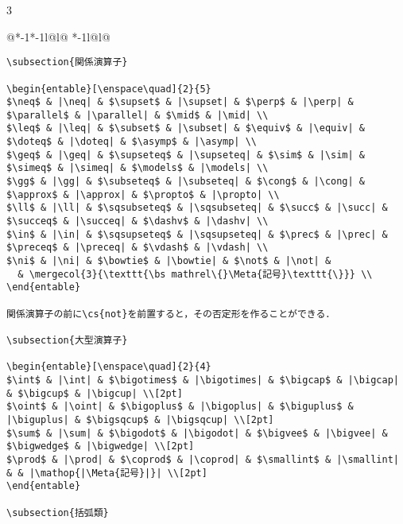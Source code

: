 \documentclass[10pt,a4paper,landscape,dvipdfmx,nomag]{jsarticle}
\makeatletter
\def\set@etsep#1#2{\def\etcolsep{#1}\def\etitemsep{#2}}
\newenvironment{entable}[3][\quad\qquad]{%
  \set@etsep#1\relax\relax
  \begin{tabular}{%
    @{}*{\the\numexpr#3-1}{*{\the\numexpr#2-1}{l@{\etcolsep}}l@{\etitemsep}}%
    *{\the\numexpr#2-1}{l@{\etcolsep}}l@{}}}{%
  \end{tabular}}
\newcommand{\mergecol}[2]{\multicolumn{#1}{@{}l@{}}{#2}}
\newcommand*\eghostguarded{%
  \ifmmode \expandafter\@firstofone
  \else \expandafter\pxqgg@eghostguarded@a
  \fi}
\def\pxqgg@eghostguarded@a#1{%
  {\pxqgg@TI\pxqgg@cwm}%
  #1%
  {\pxqgg@TI\pxqgg@cwm}}
\newcommand{\codefont}{\ttfamily\gtfamily}
\newcommand{\cs}[1]{\eghostguarded{{\codefont \bs #1}}}
\newcommand{\Meta}[1]{$\langle$\mbox{}\emph{#1}\mbox{}$\rangle$}
\makeatother
\begin{document}
\begin{multicols}{3}
\begin{entable}[\enspace]{2}{1}
\begin{verbatim}
\subsection{関係演算子}

\begin{entable}[\enspace\quad]{2}{5}
$\neq$ & |\neq| & $\supset$ & |\supset| & $\perp$ & |\perp| & $\parallel$ & |\parallel| & $\mid$ & |\mid| \\
$\leq$ & |\leq| & $\subset$ & |\subset| & $\equiv$ & |\equiv| & $\doteq$ & |\doteq| & $\asymp$ & |\asymp| \\
$\geq$ & |\geq| & $\supseteq$ & |\supseteq| & $\sim$ & |\sim| & $\simeq$ & |\simeq| & $\models$ & |\models| \\
$\gg$ & |\gg| & $\subseteq$ & |\subseteq| & $\cong$ & |\cong| & $\approx$ & |\approx| & $\propto$ & |\propto| \\
$\ll$ & |\ll| & $\sqsubseteq$ & |\sqsubseteq| & $\succ$ & |\succ| & $\succeq$ & |\succeq| & $\dashv$ & |\dashv| \\
$\in$ & |\in| & $\sqsupseteq$ & |\sqsupseteq| & $\prec$ & |\prec| & $\preceq$ & |\preceq| & $\vdash$ & |\vdash| \\
$\ni$ & |\ni| & $\bowtie$ & |\bowtie| & $\not$ & |\not| &
  & \mergecol{3}{\texttt{\bs mathrel\{}\Meta{記号}\texttt{\}}} \\
\end{entable}

関係演算子の前に\cs{not}を前置すると，その否定形を作ることができる．

\subsection{大型演算子}

\begin{entable}[\enspace\quad]{2}{4}
$\int$ & |\int| & $\bigotimes$ & |\bigotimes| & $\bigcap$ & |\bigcap| & $\bigcup$ & |\bigcup| \\[2pt]
$\oint$ & |\oint| & $\bigoplus$ & |\bigoplus| & $\biguplus$ & |\biguplus| & $\bigsqcup$ & |\bigsqcup| \\[2pt]
$\sum$ & |\sum| & $\bigodot$ & |\bigodot| & $\bigvee$ & |\bigvee| & $\bigwedge$ & |\bigwedge| \\[2pt]
$\prod$ & |\prod| & $\coprod$ & |\coprod| & $\smallint$ & |\smallint| & & |\mathop{|\Meta{記号}|}| \\[2pt]
\end{entable}

\subsection{括弧類}


\end{verbatim}
\end{entable}
\end{multicols}
\end{document}
